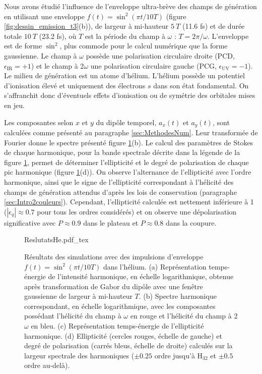 Nous avons étudié l'influence de l'enveloppe ultra-brève des champs de génération en utilisant une enveloppe $f(t) = \sin^2 (\pi t / 10 T)$ (figure \ref{fig:dessin_emission_t3}(b)), de largeur à mi-hauteur $5 \: T$ (11.6 fs) et de durée totale $10 \: T$ (23.2 fs), où $T$ est la période du champ à $\omega$ : $T = 2\pi/\omega$. L'enveloppe est de forme $\sin^2$, plus commode pour le calcul numérique que la forme gaussienne. Le champ à $\omega$ possède une polarisation circulaire droite (PCD, $\epsilon_{\text{IR}} = +1$) et le champ à 2$\omega$ une polarisation circulaire gauche (PCG,  $\epsilon_{\text{UV}} = -1$). Le milieu de génération est un atome d'hélium. L'hélium possède un potentiel d'ionisation élevé et uniquement des électrons $s$ dans son état fondamental. On s'affranchit donc d'éventuels effets d'ionisation ou de symétrie des orbitales mises en jeu.

Les composantes selon $x$ et $y$ du dipôle temporel, $a_x (t)$ et $a_y(t)$, sont calculées comme présenté au paragraphe \ref{sec:MethodesNum}. Leur transformée de Fourier donne le spectre présenté figure \ref{fig:ResultatsHe}(b). Le calcul des paramètres de Stokes de chaque harmonique, pour la bande spectrale décrite dans la légende de la figure \ref{fig:ResultatsHe}, permet de déterminer l'ellipticité et le degré de polarisation de chaque pic harmonique (figure \ref{fig:ResultatsHe}(d)). On observe l'alternance de l'ellipticité avec l'ordre harmonique, ainsi que le signe de l'ellipticité correspondant à l'hélicité des champs de génération attendus d'après les lois de conservation (paragraphe \ref{sec:Intro2couleurs}). Cependant, l'ellipticité calculée est nettement inférieure à 1 ($|\epsilon_q| \approx 0.7$ pour tous les ordres considérés) et on observe une dépolarisation significative avec $P \approx 0.9$ dans le plateau et $P \approx 0.8$ dans la coupure.

\begin{figure}
\centering
\def\svgwidth{\textwidth}
{ReslutatsHe.pdf_tex}
\caption{Résultats des simulations avec des impulsions d'enveloppe $f(t) = \sin^2 (\pi t / 10 T)$ dans l'hélium. (a) Représentation temps-énergie de l'intensité harmonique, en échelle logarithmique, obtenue après transformation de Gabor du dipôle avec une fenêtre gaussienne de largeur à mi-hauteur $T$. (b) Spectre harmonique correspondant, en échelle logarithmique, avec les composantes possédant l'hélicité du champ à $\omega$ en rouge et l'hélicité du champ à 2$\omega$ en bleu. (c) Représentation temps-énergie de l'ellipticité harmonique. (d) Ellipticité (cercles rouges, échelle de gauche) et degré de polarisation (carrés bleus, échelle de droite) calculés sur la largeur spectrale des harmoniques ($\pm 0.25$ ordre jusqu'à H$_{32}$ et $\pm 0.5$ ordre au-delà).}
\label{fig:ResultatsHe}
\end{figure}

